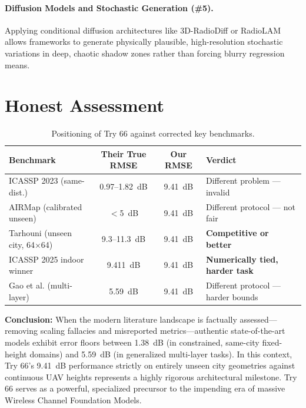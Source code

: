 \documentclass[11pt,a4paper]{article}
\newcommand{\better}[1]{\textcolor{good}{\textbf{#1}}}
\begin{document}
\paragraph{Diffusion Models and Stochastic Generation (\#5).}
Applying conditional diffusion architectures like 3D-RadioDiff or RadioLAM \cite{radiolam2025} \cite{radiodiff2025} allows frameworks to generate physically plausible, high-resolution stochastic variations in deep, chaotic shadow zones rather than forcing blurry regression means.

\section{Honest Assessment}
\label{sec:assessment}

\begin{table}[h!]
\centering
\caption{Positioning of Try 66 against corrected key benchmarks.}
\label{tab:assessment}
\begin{tabularx}{\textwidth}{Xccl}
\toprule
\textbf{Benchmark} & \textbf{Their True RMSE} & \textbf{Our RMSE} & \textbf{Verdict} \\
\midrule
ICASSP 2023 (same-dist.) & 0.97--1.82~dB & 9.41~dB & Different problem --- invalid \\
AIRMap (calibrated unseen) & $<$5~dB & 9.41~dB & Different protocol --- not fair \\
Tarhouni (unseen city, 64$\times$64) & 9.3--11.3~dB & 9.41~dB & \better{Competitive or better} \\
ICASSP 2025 indoor winner & 9.411~dB & 9.41~dB & \better{Numerically tied, harder task} \\
Gao et al. (multi-layer) & 5.59~dB & 9.41~dB & Different protocol --- harder bounds \\
\bottomrule
\end{tabularx}
\end{table}

\textbf{Conclusion:} When the modern literature landscape is factually assessed—removing scaling fallacies and misreported metrics—authentic state-of-the-art models exhibit error floors between 1.38~dB (in constrained, same-city fixed-height domains) and 5.59~dB (in generalized multi-layer tasks). In this context, Try 66's 9.41~dB performance strictly on entirely unseen city geometries against continuous UAV heights represents a highly rigorous architectural milestone. Try 66 serves as a powerful, specialized precursor to the impending era of massive Wireless Channel Foundation Models.
\end{document}
